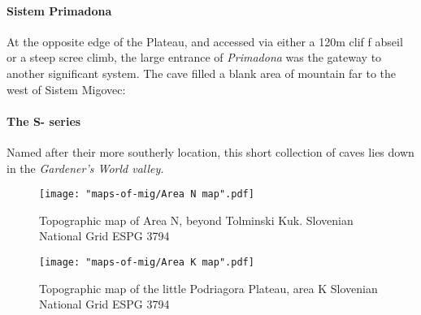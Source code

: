 \paragraph{Sistem Primadona} At the opposite edge of the Plateau, and accessed via either a 120m clif f abseil or a steep scree climb, the large entrance of \emph{Primadona} was the gateway to another significant system. The cave filled a blank area of mountain far to the west of Sistem Migovec: 

\paragraph{The S- series} Named after their more southerly location, this short collection of caves lies down in   the \emph{Gardener's World valley.}

 
 \begin{figure*}[t!]
 \checkoddpage \ifoddpage \forcerectofloat \else \forceversofloat \fi
\centering
  \texttt{[image: "maps-of-mig/Area N map".pdf]}
  \label{map m}
  \caption{Topographic map of Area N, beyond Tolminski Kuk. Slovenian National Grid ESPG 3794}
 \end{figure*}
 
 \begin{figure*}[t!]
 \checkoddpage \ifoddpage \forcerectofloat \else \forceversofloat \fi
\centering
  \texttt{[image: "maps-of-mig/Area K map".pdf]}
  \label{map m}
  \caption{Topographic map of the little Podriagora Plateau, area K Slovenian National Grid ESPG 3794}
 \end{figure*}
 
 
